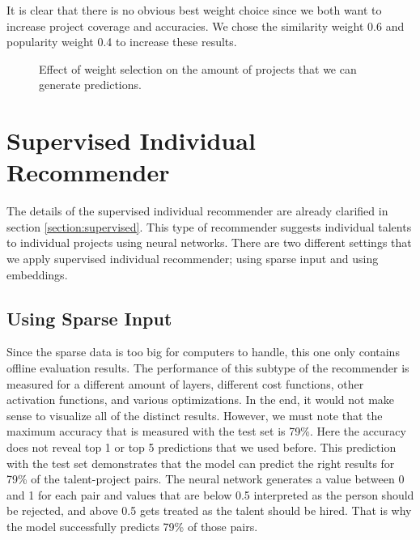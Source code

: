 It is clear that there is no obvious best weight choice since we both want to increase project coverage and accuracies. We chose the similarity weight 0.6 and popularity weight 0.4 to increase these results.

\begin{figure}[htpb]
	\centering
	
	\exampleA
	\caption[Coverage figure]{Effect of weight selection on the amount of projects that we can generate predictions.}\label{fig:weight-selection-coverage}
\end{figure}


\section{Supervised Individual Recommender}

The details of the supervised individual recommender are already clarified in section \ref{section:supervised}. This type of recommender suggests individual talents to individual projects using neural networks. There are two different settings that we apply supervised individual recommender; using sparse input and using embeddings. 

\subsection{Using Sparse Input}

Since the sparse data is too big for computers to handle, this one only contains offline evaluation results. The performance of this subtype of the recommender is measured for a different amount of layers, different cost functions, other activation functions, and various optimizations. In the end, it would not make sense to visualize all of the distinct results. However, we must note that the maximum accuracy that is measured with the test set is 79\%. Here the accuracy does not reveal top 1 or top 5 predictions that we used before. This prediction with the test set demonstrates that the model can predict the right results for 79\% of the talent-project pairs. The neural network generates a value between 0 and 1 for each pair and values that are below 0.5 interpreted as the person should be rejected, and above 0.5 gets treated as the talent should be hired. That is why the model successfully predicts 79\% of those pairs.

